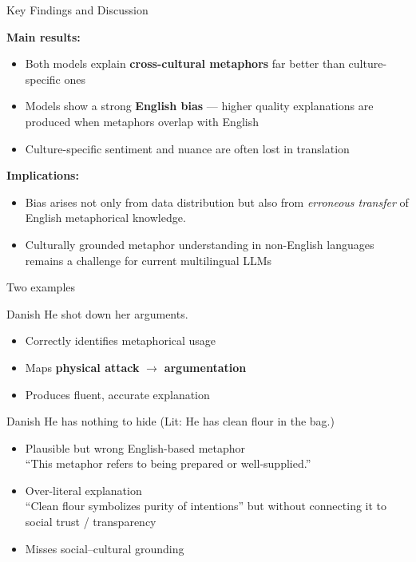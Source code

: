 \documentclass[xetex]{beamer}
\begin{document}
\begin{frame}{Key Findings and Discussion}

\textbf{Main results:}
\begin{itemize}
  \item Both models explain \textbf{cross-cultural metaphors} far better than culture-specific ones
  \item Models show a strong \textbf{English bias} — higher quality explanations are produced when metaphors overlap with English
  \item Culture-specific sentiment and nuance are often lost in translation
\end{itemize}

\medskip
\textbf{Implications:}
\begin{itemize}
  \item Bias arises not only from data distribution but also from \emph{erroneous transfer} of English metaphorical knowledge. 
  \item Culturally grounded metaphor understanding in non-English languages remains a challenge for current multilingual LLMs
\end{itemize}

\end{frame}

\begin{frame}{Two examples}
  \begin{exe}
    \ex {} \hfill Danish
    \trans He shot down her arguments.
  \end{exe}
  \begin{itemize}
  \item Correctly identifies metaphorical usage
  \item Maps \textbf{physical attack} $\rightarrow$ \textbf{argumentation}
  \item Produces fluent, accurate explanation
  \end{itemize}

  \begin{exe}
    \ex {} \hfill Danish
    \trans He has nothing to hide (Lit: He has clean flour in the bag.)
  \end{exe}
  \begin{itemize}
  \item Plausible but wrong English-based metaphor
    \\ “This metaphor refers to being prepared or well-supplied.”
  \item Over-literal explanation
    \\ “Clean flour symbolizes purity of intentions”
    but without connecting it to social trust / transparency
  \item Misses social–cultural grounding
  \end{itemize}


\end{frame}
\end{document}
